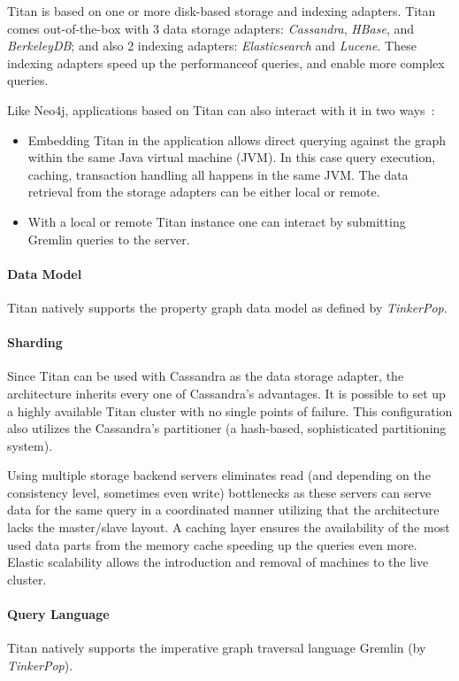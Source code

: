 Titan is based on one or more disk-based storage and indexing adapters. Titan comes out-of-the-box with 3 data storage adapters: \emph{Cassandra}, \emph{HBase}, and \emph{BerkeleyDB}; and also 2 indexing adapters: \emph{Elasticsearch} and \emph{Lucene}. These indexing adapters speed up the performanceof queries, and enable more complex queries.

Like Neo4j, applications based on Titan can also interact with it in two ways~\cite{titan-arch}:
\begin{itemize}[topsep=0pt]
  \item Embedding Titan in the application allows direct querying against the graph within the same Java virtual machine (JVM). In this case query execution, caching, transaction handling all happens in the same JVM. The data retrieval from the storage adapters can be either local or remote.
  \item With a local or remote Titan instance one can interact by submitting Gremlin queries to the server.
\end{itemize}


\paragraph{Data Model}
Titan natively supports the property graph data model as defined by \emph{TinkerPop}.

\paragraph{Sharding}
Since Titan can be used with Cassandra as the data storage adapter, the architecture inherits every one of Cassandra's advantages. It is possible to set up a highly available Titan cluster with no single points of failure. This configuration also utilizes the Cassandra's partitioner (a hash-based, sophisticated partitioning system).

Using multiple storage backend servers eliminates read (and depending on the consistency level, sometimes even write) bottlenecks as these servers can serve data for the same query in a coordinated manner utilizing that the architecture lacks the master/slave layout. A caching layer ensures the availability of the most used data parts from the memory cache speeding up the queries even more. Elastic scalability allows the introduction and removal of machines to the live cluster.


\paragraph{Query Language}
Titan natively supports the imperative graph traversal language Gremlin (by \emph{TinkerPop}).


